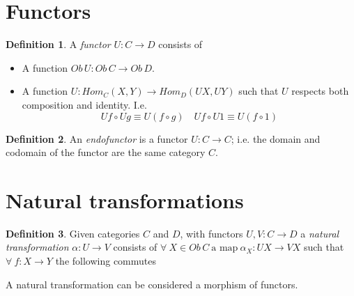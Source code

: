 \documentclass{article}
\theoremstyle{definition}
\newtheorem{definition}{Definition}[section]
\begin{document}
\section{Functors}
\begin{definition}
    A \textit{functor} $U : C \rightarrow D$ consists of
    \begin{itemize}
        \item A function $Ob\,U : Ob\,C \rightarrow Ob\,D$.
        \item A function $U : Hom_C(X,Y) \rightarrow Hom_D(UX, UY)$
            such that $U$ respects both composition and identity.
            I.e.
            $$Uf \circ Ug \equiv U(f \circ g) \quad Uf \circ U1 \equiv U(f \circ 1)$$
    \end{itemize}
\end{definition}

\begin{definition}
    An \textit{endofunctor} is a functor $U : C \rightarrow C$;
    i.e. the domain and codomain of the functor are the same category $C$.
\end{definition}

\section{Natural transformations}
\begin{definition}
    Given categories $C$ and $D$,
    with functors $U, V : C \rightarrow D$
    a \textit{natural transformation} $\alpha : U \rightarrow V$
    consists of
    $
    \forall\ X \in Ob\,C\ \textrm{a map}
    \ \alpha_X : UX \rightarrow VX
    $
    such that $\forall\ f : X \rightarrow Y$ the following commutes
    \begin{center}
    \end{center}
    A natural transformation can be considered a morphism of functors.
\end{definition}
\end{document}
